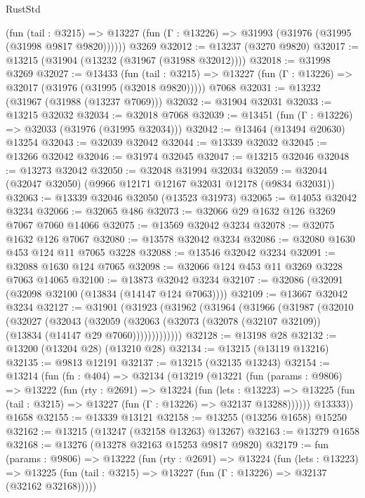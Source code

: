 \begin{lexlean}{RustStd}
\begin{coremodule}
      (fun (tail : @3215) =>
      @13227 (fun (Γ : @13226) => @31993 (@31976 (@31995 (@31998 @9817 @9820))))))
    @3269
@32012 := @13237 (@3270 @9820)
@32017 := @13215 (@31904 (@13232 (@31967 (@31988 @32012))))
@32018 := @31998 @3269
@32027 := @13433
    (fun (tail : @3215) => @13227 (fun (Γ : @13226) => @32017 (@31976 (@31995 (@32018 @9820)))))
    @7068
@32031 := @13232 (@31967 (@31988 (@13237 @7069)))
@32032 := @31904 @32031
@32033 := @13215 @32032
@32034 := @32018 @7068
@32039 := @13451 (fun (Γ : @13226) => @32033 (@31976 (@31995 @32034)))
@32042 := @13464 (@13494 @20630) @13254
@32043 := @32039 @32042
@32044 := @13339 @32032
@32045 := @13266 @32042
@32046 := @31974 @32045
@32047 := @13215 @32046
@32048 := @13273 @32042
@32050 := @32048 @31994 @32034
@32059 := @32044 (@32047 @32050) (@9966 @12171 @12167 @32031 @12178 (@9834 @32031))
@32063 := @13339 @32046 @32050 (@13523 @31973)
@32065 := @14053 @32042 @3234
@32066 := @32065 @486
@32073 := @32066 @29 @1632 @126 @3269 @7067 @7060 @14066
@32075 := @13569 @32042 @3234
@32078 := @32075 @1632 @126 @7067
@32080 := @13578 @32042 @3234
@32086 := @32080 @1630 @453 @124 @11 @7065 @3228
@32088 := @13546 @32042 @3234
@32091 := @32088 @1630 @124 @7065
@32098 := @32066 @124 @453 @11 @3269 @3228 @7063 @14065
@32100 := @13873 @32042 @3234
@32107 := @32086 (@32091 (@32098 @32100 (@13834 (@14147 @124 @7063))))
@32109 := @13667 @32042 @3234
@32127 := @31901
    (@31923
      (@31962
        (@31964
          (@31966
            (@31987
              (@32010
                (@32027
                  (@32043
                    (@32059
                      (@32063
                        (@32073 (@32078 (@32107 @32109)) (@13834 (@14147 @29 @7060)))))))))))))
@32128 := @13198 @28
@32132 := @13200 (@13204 @28) (@13210 @28)
@32134 := @13215 (@13119 @13216)
@32135 := @9813 @12191
@32137 := @13215 (@32135 @13243)
@32154 := @13214
    (fun (fn : @404) =>
    @32134
      (@13219
        (@13221
          (fun (params : @9806) =>
          @13222
            (fun (rty : @2691) =>
            @13224
              (fun (lets : @13223) =>
              @13225 (fun (tail : @3215) => @13227 (fun (Γ : @13226) => @32137 @13288))))))
        @13333))
    @1658
@32155 := @13339 @13121
@32158 := @13255 (@13256 @1658) @15250
@32162 := @13215 (@13247 (@32158 @13263) @13267)
@32163 := @13279 @1658
@32168 := @13276 (@13278 @32163 @15253 @9817 @9820)
@32179 := fun (params : @9806) =>
  @13222
    (fun (rty : @2691) =>
    @13224
      (fun (lets : @13223) =>
      @13225 (fun (tail : @3215) => @13227 (fun (Γ : @13226) => @32137 (@32162 @32168)))))

\end{coremodule}
\end{lexlean}
